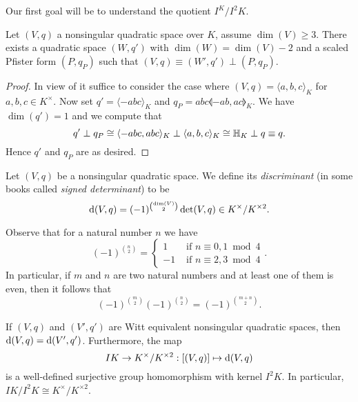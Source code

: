 \documentclass[12pt, leqno, british]{amsart}
\begin{document}
Our first goal will be to understand the quotient $I^K/I^2K$.
\begin{lem}\label{L:split-off-2fold-Pfister}
Let $(V, q)$ a nonsingular quadratic space over $K$, assume $\dim(V) \geq 3$.
There exists a quadratic space $(W, q')$ with $\dim(W) = \dim(V) - 2$ and a scaled Pfister form $(P, q_P)$ such that $(V, q) \equiv (W', q') \perp (P, q_P)$.
\end{lem}
\begin{proof}
In view of  it suffice to consider the case where $(V, q) = \langle a, b, c \rangle_K$ for $a, b, c \in K^\times$.
Now set $q' = \langle -abc \rangle_K$ and $q_P = abc\llangle -ab, ac \rrangle_K$.
We have $\dim(q') = 1$ and we compute that
$$q' \perp q_P \cong \langle -abc , abc \rangle_K \perp \langle a, b, c \rangle_K \cong \mathbb{H}_K \perp q \equiv q.$$
Hence $q'$ and $q_P$ are as desired.
\end{proof}
\begin{defi}
Let $(V, q)$ be a nonsingular quadratic space.
We define its \emph{discriminant} (in some books called \emph{signed determinant}) to be
$$ \mathrm{d}(V, q) = (-1)^{\binom{\dim(V)}{2}} \det(V, q) \in K^\times/K^{\times 2}.$$
\end{defi}
Observe that for a natural number $n$ we have
\begin{equation*}\label{E:binom}
(-1)^{\binom{n}{2}} = \begin{cases}
1 &\text{ if } n \equiv 0, 1 \bmod 4 \\
-1 &\text{ if } n \equiv 2, 3 \bmod 4
\end{cases}.
\end{equation*}
In particular, if $m$ and $n$ are two natural numbers and at least one of them is even, then it follows that
\begin{equation}\label{E:binom2}
(-1)^{\binom{m}{2}}(-1)^{\binom{n}{2}} = (-1)^{\binom{m+n}{2}}.
\end{equation}
\begin{prop}\label{P:disc-map}
If $(V, q)$ and $(V', q')$ are Witt equivalent nonsingular quadratic spaces, then $\mathrm{d}(V, q) = \mathrm{d}(V', q')$.
Furthermore, the map
$$ IK \to K^\times/K^{\times 2} : [(V, q)] \mapsto \mathrm{d}(V, q) $$
is a well-defined surjective group homomorphism with kernel $I^2K$.
In particular, $IK/I^2K \cong K^\times / K^{\times 2}$.
\end{prop}
\end{document}
